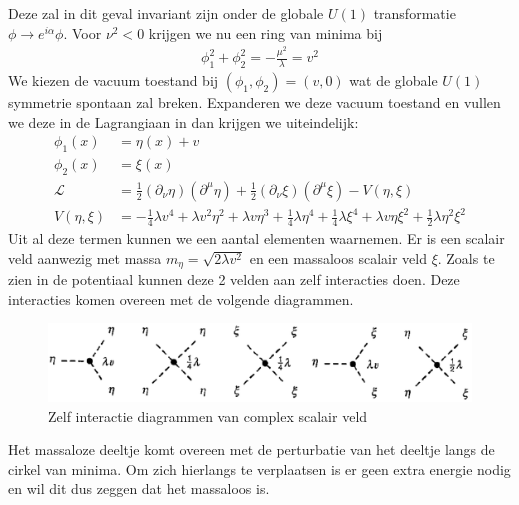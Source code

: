 \documentclass[../main.tex]{subfiles}
\begin{document}
Deze zal in dit geval invariant zijn onder de globale $U(1)$ transformatie $\phi \rightarrow e^{i\alpha}\phi$. Voor $\nu^2<0$ krijgen we nu een ring van minima bij
\begin{equation}
    \begin{aligned}
        \label{eq:complex_symm_breking}
        \phi_1^2+\phi_2^2 = -\frac{\mu^2}{\lambda} =v^2
    \end{aligned}
\end{equation}
We kiezen de vacuum toestand bij $(\phi_1, \phi_2) = (v,0)$ wat de globale $U(1)$ symmetrie spontaan zal breken. Expanderen we deze vacuum toestand en vullen we deze in de Lagrangiaan in dan krijgen we uiteindelijk:
\begin{equation}
    \begin{aligned}
        \label{eq:comple_scalair_veld_symm_breking}
        \phi_1(x) &= \eta(x) + v\\
        \phi_2(x) &= \xi(x)\\
        \mathcal{L} &= \frac{1}{2} (\partial_\nu \eta) (\partial^\mu \eta) + \frac{1}{2} (\partial_\nu \xi) (\partial^\mu \xi) - V(\eta, \xi)\\
        V(\eta, \xi) &= -\frac{1}{4} \lambda v^4 + \lambda v^2 \eta^2 + \lambda v \eta^3 + \frac{1}{4} \lambda \eta^4 + \frac{1}{4} \lambda \xi^4 + \lambda v \eta\xi^2 + \frac{1}{2} \lambda \eta^2\xi^2
    \end{aligned}
\end{equation}
Uit al deze termen kunnen we een aantal elementen waarnemen. Er is een scalair veld aanwezig met massa $m_\eta = \sqrt{2\lambda v^2}$ en een massaloos scalair veld $\xi$. Zoals te zien in de potentiaal kunnen deze 2 velden aan zelf interacties doen. Deze interacties komen overeen met de volgende diagrammen.

\begin{figure}[h]
    \centering
    \includegraphics[width=0.8\linewidth]{higgs_boson/complex_scalair_veld_int.png}
    \caption{Zelf interactie diagrammen van complex scalair veld}%
    \label{fig:higgs_boson/complex_scalair_veld_int}
\end{figure}

Het massaloze deeltje komt overeen met de perturbatie van het deeltje langs de cirkel van minima. Om zich hierlangs te verplaatsen is er geen extra energie nodig en wil dit dus zeggen dat het massaloos is.
\end{document}
